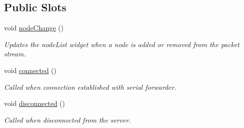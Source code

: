 \subsection*{Public Slots}
\begin{DoxyCompactItemize}
\item 
\hypertarget{classMainWindow_a5d0ce13b14ee5fe76a4f7ed7f1de81c5}{
void \hyperlink{classMainWindow_a5d0ce13b14ee5fe76a4f7ed7f1de81c5}{nodeChange} ()}
\label{classMainWindow_a5d0ce13b14ee5fe76a4f7ed7f1de81c5}

\begin{DoxyCompactList}\small\item\em Updates the nodeList widget when a node is added or removed from the packet stream. \item\end{DoxyCompactList}\item 
\hypertarget{classMainWindow_ab0f207dba0ad81324d034d29988f8fd3}{
void \hyperlink{classMainWindow_ab0f207dba0ad81324d034d29988f8fd3}{connected} ()}
\label{classMainWindow_ab0f207dba0ad81324d034d29988f8fd3}

\begin{DoxyCompactList}\small\item\em Called when connection established with serial forwarder. \item\end{DoxyCompactList}\item 
\hypertarget{classMainWindow_aa4f105b7d0e0c56c5051e89710c852d6}{
void \hyperlink{classMainWindow_aa4f105b7d0e0c56c5051e89710c852d6}{disconnected} ()}
\label{classMainWindow_aa4f105b7d0e0c56c5051e89710c852d6}

\begin{DoxyCompactList}\small\item\em Called when disconnected from the server. \item\end{DoxyCompactList}\end{DoxyCompactItemize}
